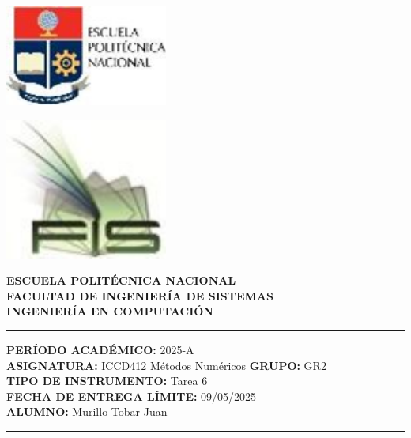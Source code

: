 \documentclass[12pt]{article}
\begin{document}
\begin{minipage}{0.45\textwidth}
    \includegraphics[width=0.4\textwidth]{inFiles/Figures/epnLogo.jpg}
\end{minipage}
\hfill
\begin{minipage}{0.45\textwidth}
    \raggedleft
    \includegraphics[width=0.4\textwidth]{inFiles/Figures/FIS_logo.jpg}
\end{minipage}

\vspace{0.5cm}

\begin{center}
    \textbf{ESCUELA POLITÉCNICA NACIONAL}\\[0.2cm]
    \textbf{FACULTAD DE INGENIERÍA DE SISTEMAS}\\[0.2cm]
    \textbf{INGENIERÍA{\textbf{ EN COMPUTACIÓN}}}
\end{center}

\vspace{0.5cm}
\hrule
\vspace{0.5cm}

\noindent\textbf{PERÍODO ACADÉMICO:} 2025-A\\[0.2cm]
\noindent\textbf{ASIGNATURA:} ICCD412 Métodos Numéricos \hfill \textbf{GRUPO:} GR2\\[0.2cm]
\noindent\textbf{TIPO DE INSTRUMENTO:} Tarea 6\\[0.2cm]
\noindent\textbf{FECHA DE ENTREGA LÍMITE:} 09/05/2025\\[0.2cm]
\noindent\textbf{ALUMNO:} Murillo Tobar Juan 

\vspace{0.5cm}
\hrule
\vspace{1cm}
\end{document}

